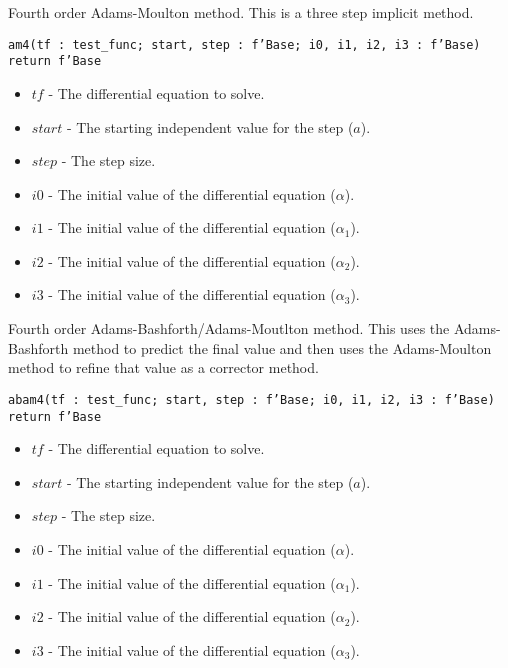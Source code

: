 \documentclass[10pt, openany]{book}
\newcommand{\function}[1]{\texttt{#1}}
\begin{document}
Fourth order Adams-Moulton method.  This is a three step implicit method.

\function{am4(tf : test\_func; start, step : f'Base; i0, i1, i2, i3 : f'Base) return f'Base}
\begin{itemize}
  \item $tf$ - The differential equation to solve.
  \item $start$ - The starting independent value for the step ($a$).
  \item $step$ - The step size.
  \item $i0$ - The initial value of the differential equation ($\alpha$).
  \item $i1$ - The initial value of the differential equation ($\alpha_1$).
  \item $i2$ - The initial value of the differential equation ($\alpha_2$).
  \item $i3$ - The initial value of the differential equation ($\alpha_3$).
\end{itemize}

Fourth order Adams-Bashforth/Adams-Moutlton method.  This uses the Adams-Bashforth method to predict the final value and then uses the Adams-Moulton method to refine that value as a corrector method.

\function{abam4(tf : test\_func; start, step : f'Base; i0, i1, i2, i3 : f'Base) return f'Base}
\begin{itemize}
  \item $tf$ - The differential equation to solve.
  \item $start$ - The starting independent value for the step ($a$).
  \item $step$ - The step size.
  \item $i0$ - The initial value of the differential equation ($\alpha$).
  \item $i1$ - The initial value of the differential equation ($\alpha_1$).
  \item $i2$ - The initial value of the differential equation ($\alpha_2$).
  \item $i3$ - The initial value of the differential equation ($\alpha_3$).
\end{itemize}
\end{document}
